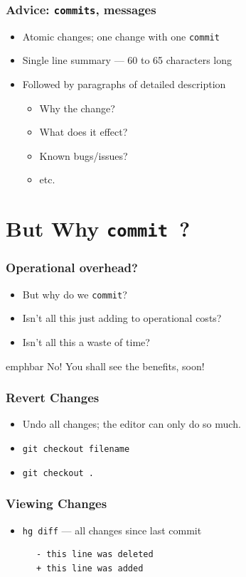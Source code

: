 \documentclass[14pt,compress]{beamer}
\newcommand{\emphbar}[1]
{\begin{beamercolorbox}[rounded=true]{emphbar}
      {#1}
 \end{beamercolorbox}
}
\newcounter{time}
\newcommand{\typ}[1]{\lstinline{#1}}
\begin{document}
\begin{frame}
  \frametitle{\alert{Advice}: \typ{commits}, messages}
  \begin{itemize}
  \item Atomic changes; one change with one \typ{commit}
  \item Single line summary --- 60 to 65 characters long
  \item Followed by paragraphs of detailed description
    \begin{itemize}
    \item Why the change?
    \item What does it effect?
    \item Known bugs/issues?
    \item etc.
    \end{itemize}
  \end{itemize}
\end{frame}

\section{But Why \typ{commit}~?}

\begin{frame}
  \frametitle{Operational overhead?}
  \begin{itemize}
  \item But why do we \typ{commit}?
  \item Isn't all this just adding to operational costs?
  \item Isn't all this a waste of time?
  \end{itemize}
  \begin{center}
    \emphbar{No! You shall see the benefits, soon!}
  \end{center}
\end{frame}

\begin{frame}
  \frametitle{Revert Changes}
  \begin{itemize}
  \item Undo all changes; the editor can only do so much.
  \item \typ{git checkout filename}
  \item \typ{git checkout .}
  \end{itemize}
\end{frame}


\begin{frame}[fragile]
  \frametitle{Viewing Changes}
  \begin{itemize}
  \item \typ{hg diff} --- all changes since last commit
  \end{itemize}
  \begin{block}{}
    \begin{lstlisting}
      - this line was deleted
      + this line was added
    \end{lstlisting}
  \end{block}
\end{frame}
\end{document}
